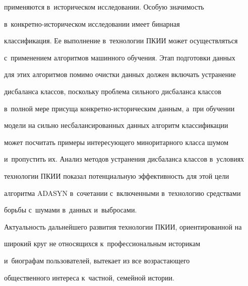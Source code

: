 применяются в~историческом исследовании. Особую значимость  


в~кон\-крет\-но-ис\-то\-ри\-че\-ском исследовании имеет бинарная 


классификация. Ее выполнение в~технологии ПКИИ может осуществляться 


с~применением алгоритмов машинного обучения. Этап подготовки данных 


для этих алгоритмов помимо очистки данных должен включать устранение 


дисбаланса классов, поскольку проблема сильного дисбаланса классов 


в~полной мере присуща конкретно-историческим данным, а~при обуче\-нии 


модели на сильно несбалансированных данных алгоритм классификации 


может посчитать примеры интересующего миноритарного класса шумом 


и~пропустить их. Анализ методов устранения дисбаланса классов в~условиях 


технологии ПКИИ показал потенциальную эффективность для этой цели 


алгоритма ADASYN в~сочетании с~включенными в~технологию средствами 


борьбы с~шумами в~данных и~выбросами.


  


  Актуальность дальнейшего развития технологии ПКИИ, ориентированной на 


широкий круг не относящихся к~профессиональным историкам  


и~био\-гра\-фам пользователей, вытекает из все воз\-рас\-та\-юще\-го 


общественного интереса к~частной, семейной истории.


  


